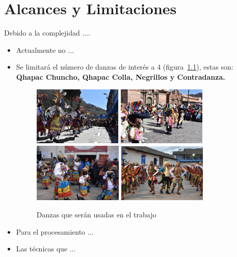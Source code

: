\chapter{Alcances y Limitaciones}
\label{chp:alcances}
Debido a la complejidad ....
\begin{itemize}
\item Actualmente no ...
\item Se limitará el número de danzas de interés a 4 (figura~\ref{fig:chp-alc:dance-dataset}), estas son: \textbf{Qhapac Chuncho, Qhapac Colla, Negrillos y Contradanza.}
\begin{figure}[!htb]
  \centering
  \caption{Danzas que serán usadas en el trabajo}
  \includegraphics[width=0.4\textwidth]{figs/alcances/qhapacchuncho.JPG} \hspace*{0.01cm}
  \includegraphics[width=0.4\textwidth]{figs/alcances/qhapaccolla.JPG} 
  \includegraphics[width=0.404\textwidth]{figs/alcances/negrillo.JPG} \hspace*{0.01cm}
  \includegraphics[width=0.4\textwidth]{figs/alcances/contradanza.JPG}
  \label{fig:chp-alc:dance-dataset}
\end{figure}

\item Para el procesamiento ...
\item Las técnicas que ...

\end{itemize}



